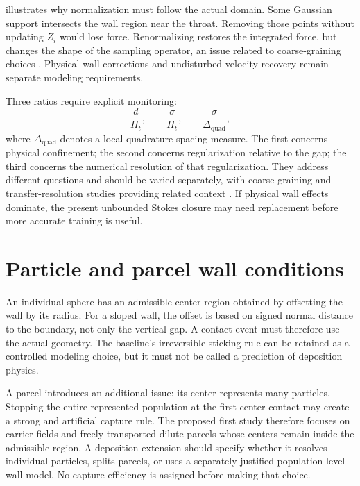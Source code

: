  illustrates why normalization must follow the
actual domain. Some Gaussian support intersects the wall region near the
throat. Removing those points without updating $Z_i$ would lose force.
Renormalizing restores the integrated force, but changes the shape of the
sampling operator, an issue related to coarse-graining choices
\citep{sun2015}. Physical wall corrections \citep{goldman1967,brenner1961}
and undisturbed-velocity recovery \citep{horwitz2016,ireland2017} remain
separate modeling requirements. %


Three ratios require explicit monitoring:
\begin{equation}
 \frac{d}{H_t},\qquad \frac{\sigma}{H_t},\qquad
 \frac{\sigma}{\Delta_{\mathrm{quad}}},
 \label{eq:constriction_ratios}
\end{equation}
where $\Delta_{\mathrm{quad}}$ denotes a local quadrature-spacing measure.
The first concerns physical confinement; the second concerns regularization
relative to the gap; the third concerns the numerical resolution of that
regularization. They address different questions and should be varied
separately, with coarse-graining and transfer-resolution studies providing
related context \citep{sun2015,capecelatro2013}. %
 If physical wall effects dominate, the present unbounded
Stokes closure may need replacement before more accurate training is useful.

\section{Particle and parcel wall conditions}
An individual sphere has an admissible center region obtained by offsetting
the wall by its radius. For a sloped wall, the offset is based on signed
normal distance to the boundary, not only the vertical gap. A contact event
must therefore use the actual geometry. The baseline's irreversible
sticking rule can be retained as a controlled modeling choice, but it must
not be called a prediction of deposition physics.

A parcel introduces an additional issue: its center represents many
particles. Stopping the entire represented population at the first center
contact may create a strong and artificial capture rule. The proposed
first study therefore focuses on carrier fields and freely transported
dilute parcels whose centers remain inside the admissible region. A
deposition extension should specify whether it resolves individual
particles, splits parcels, or uses a separately justified population-level
wall model. No capture efficiency is assigned before making that choice.

